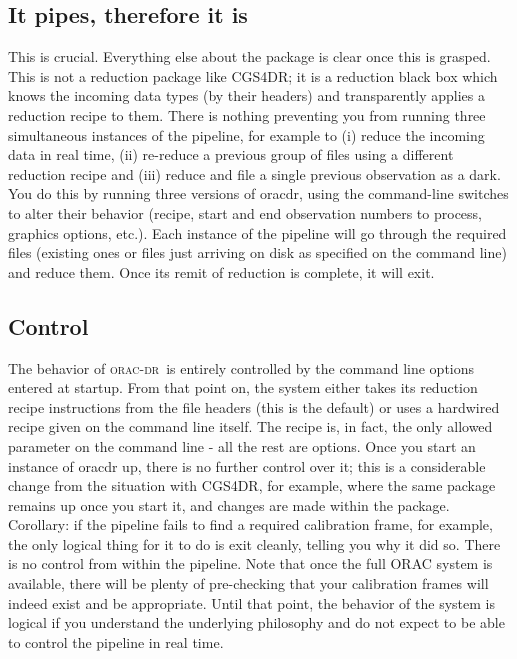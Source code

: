 \documentclass[twoside,11pt]{article}
\renewcommand{\_}{\texttt{\symbol{95}}}
\newcommand{\oracdr}{\textsc{orac-dr}}
\begin{document}
\subsection*{It pipes, therefore it is\label{Introduction_to_ORAC-DR_It_pipes_therefore_it_is}}

This is crucial. Everything else about the package is clear once this
is grasped. This is not a reduction package like CGS4DR; it is a
reduction black box which knows the incoming data types (by their
headers) and transparently applies a reduction recipe to them. There
is nothing preventing you from running three simultaneous instances of
the pipeline, for example to (i) reduce the incoming data in real
time, (ii) re-reduce a previous group of files using a different
reduction recipe and (iii) reduce and file a single previous
observation as a dark. You do this by running three versions of
oracdr, using the command-line switches to alter their behavior
(recipe, start and end observation numbers to process, graphics
options, etc.). Each instance of the pipeline will go through the
required files (existing ones or files just arriving on disk as
specified on the command line) and reduce them. Once its remit of
reduction is complete, it will exit.

\subsection*{Control\label{Introduction_to_ORAC-DR_Control}}

The behavior of \oracdr\ is entirely controlled by the command line
options entered at startup. From that point on, the system either
takes its reduction recipe instructions from the file headers (this is
the default) or uses a hardwired recipe given on the command line
itself. The recipe is, in fact, the only allowed parameter on the
command line - all the rest are options. Once you start an instance of
oracdr up, there is no further control over it; this is a considerable
change from the situation with CGS4DR, for example, where the same
package remains up once you start it, and changes are made within the
package. Corollary: if the pipeline fails to find a required
calibration frame, for example, the only logical thing for it to do is
exit cleanly, telling you why it did so. There is no control from
within the pipeline. Note that once the full ORAC system is available,
there will be plenty of pre-checking that your calibration frames will
indeed exist and be appropriate. Until that point, the behavior of
the system is logical if you understand the underlying philosophy and
do not expect to be able to control the pipeline in real time.
\end{document}
